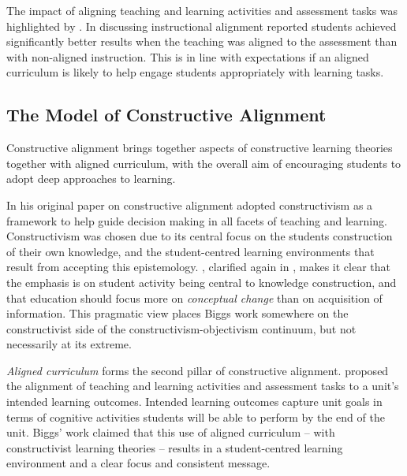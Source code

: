 The impact of aligning teaching and learning activities and assessment tasks was highlighted by \citet{Cohen:1987}. In discussing instructional alignment \citet{Cohen:1987} reported students achieved significantly better results when the teaching was aligned to the assessment than with non-aligned instruction. This is in line with expectations if an aligned curriculum is likely to help engage students appropriately with learning tasks.


\subsection{The Model of Constructive Alignment} %
\label{sub:the_model_of_constructive_alignment}

Constructive alignment brings together aspects of constructive learning theories together with aligned curriculum, with the overall aim of encouraging students to adopt deep approaches to learning.

In his original paper on constructive alignment \citet{Biggs:1996c} adopted constructivism as a framework to help guide decision making in all facets of teaching and learning. Constructivism was chosen due to its central focus on the students construction of their own knowledge, and the student-centred learning environments that result from accepting this epistemology. \citet{Biggs:1996c}, clarified again in \citet{Biggs:2007}, makes it clear that the emphasis is on student activity being central to knowledge construction, and that education should focus more on \emph{conceptual change} than on acquisition of information. This pragmatic view places Biggs work somewhere on the constructivist side of the constructivism-objectivism continuum, but not necessarily at its extreme. 

\emph{Aligned curriculum} forms the second pillar of constructive alignment. \citet{Biggs:1996c} proposed the alignment of teaching and learning activities and assessment tasks to a unit's intended learning outcomes. Intended learning outcomes capture unit goals in terms of cognitive activities students will be able to perform by the end of the unit. Biggs' work claimed that this use of aligned curriculum -- with constructivist learning theories -- results in a student-centred learning environment and a clear focus and consistent message.

